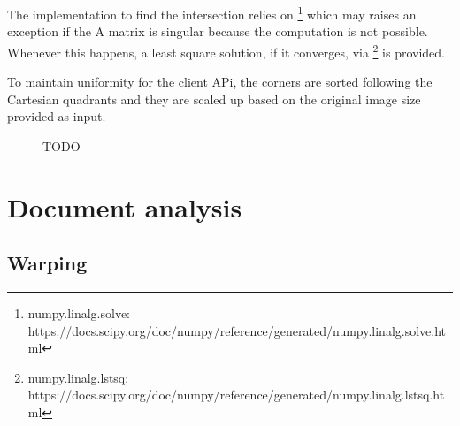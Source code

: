 \documentclass[a4paper]{article}
\begin{document}
The implementation to find the intersection relies on \footnote{ numpy.linalg.solve: https://docs.scipy.org/doc/numpy/reference/generated/numpy.linalg.solve.html} which may raises an exception if the A matrix is singular because the computation is not possible. Whenever this happens, a least square solution, if it converges, via \footnote{numpy.linalg.lstsq: https://docs.scipy.org/doc/numpy/reference/generated/numpy.linalg.lstsq.html} is provided.

To maintain uniformity for the client APi, the corners are sorted following the Cartesian quadrants and they are scaled up based on the original image size provided as input.

\begin{figure}[H]
	\caption{TODO}
	\label{fig:computingcorners}
\end{figure}

\section{Document analysis}

\subsection{Warping}
\end{document}
